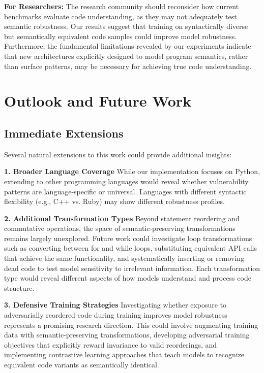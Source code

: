 \documentclass[%
thesis=student,%
coverpage=false,%
titlepage=false,%
headmarks=true, %
english,%
font=libertine, %
math=newpxtx, %
BCOR=5mm,%
coverBCOR=11mm%
]{tum-templates/book/tumbook}
\begin{document}
\textbf{For Researchers:}
The research community should reconsider how current benchmarks evaluate code understanding, as they may not adequately test semantic robustness. Our results suggest that training on syntactically diverse but semantically equivalent code samples could improve model robustness. Furthermore, the fundamental limitations revealed by our experiments indicate that new architectures explicitly designed to model program semantics, rather than surface patterns, may be necessary for achieving true code understanding.

\section{Outlook and Future Work}

\subsection{Immediate Extensions}

Several natural extensions to this work could provide additional insights:

\textbf{1. Broader Language Coverage}
While our implementation focuses on Python, extending to other programming languages would reveal whether vulnerability patterns are language-specific or universal. Languages with different syntactic flexibility (e.g., C++ vs. Ruby) may show different robustness profiles.

\textbf{2. Additional Transformation Types}
Beyond statement reordering and commutative operations, the space of semantic-preserving transformations remains largely unexplored. Future work could investigate loop transformations such as converting between for and while loops, substituting equivalent API calls that achieve the same functionality, and systematically inserting or removing dead code to test model sensitivity to irrelevant information. Each transformation type would reveal different aspects of how models understand and process code structure.


\textbf{3. Defensive Training Strategies}
Investigating whether exposure to adversarially reordered code during training improves model robustness represents a promising research direction. This could involve augmenting training data with semantic-preserving transformations, developing adversarial training objectives that explicitly reward invariance to valid reorderings, and implementing contrastive learning approaches that teach models to recognize equivalent code variants as semantically identical.
\end{document}
